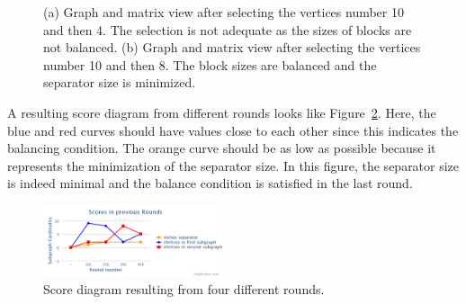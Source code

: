 \documentclass[11pt, twoside,a4paper]{book}
\newcommand{\figref}[1]{Figure~\protect\ref{#1}}
\begin{document}
\begin{figure}
\centering
{}
\hfill
{}
\caption{
(a) Graph and matrix view after selecting the vertices number 10 and then 4.
The selection is not adequate as the sizes of blocks are not balanced.
(b) Graph and matrix view after selecting the vertices number 10 and then 8. The block sizes are balanced and the separator size is minimized.}
\label{selected_4_10_8_10}
\end{figure}

A resulting score diagram from different rounds looks
like \figref{diagram}. Here, the blue and red curves should have
values close to each other since this indicates the balancing condition.
The orange curve should be as low as possible
because it represents the minimization of the separator size.
In this figure, the separator size is indeed minimal and the
balance condition is satisfied in the last round.
\begin{figure}
\centering
\includegraphics[width=0.47\textwidth]{diagram}
\caption{Score diagram resulting from four different rounds.}
\label{diagram}
\end{figure}
\end{document}
